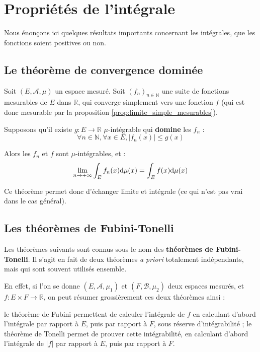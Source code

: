 \documentclass[../integ-proba.tex]{subfiles}
\begin{document}
\section{Propriétés de l'intégrale}

Nous énonçons ici quelques résultats importants concernant les intégrales, que les fonctions soient positives ou non.

\subsection{Le théorème de convergence dominée}

\begin{thm}
  \label{thm:convergence_dominee}
  Soit $\left(E,\mathcal{A},\mu\right)$ un espace mesuré.
  Soit $\left(f_n\right)_{n \in \mathbb{N}}$ une suite de fonctions mesurables de $E$ dans $\mathbb{R}$, qui converge simplement vers une fonction $f$ (qui est donc mesurable par la proposition \ref{prop:limite_simple_mesurables}).

  Supposons qu'il existe $g:E \longrightarrow \mathbb{R}$ $\mu$-intégrable qui \textbf{domine} les $f_n$ :
  $$
  \forall n \in \mathbb{N}, \forall x \in E, \left|f_n(x)\right| \leq g(x)
  $$

  Alors les $f_n$ et $f$ sont $\mu$-intégrables, et :
  $$
  \lim_{n \to + \infty} \int_E f_n(x) \textnormal{d}\mu(x) = \int_E f(x) \textnormal{d}\mu(x)
  $$
\end{thm}

\begin{rem}
  Ce théorème permet donc d'échanger limite et intégrale (ce qui n'est pas vrai dans le cas général).
\end{rem}

\subsection{Les théorèmes de Fubini-Tonelli}

Les théorèmes suivants sont connus sous le nom des \textbf{théorèmes de Fubini-Tonelli}.
Il s'agit en fait de deux théorèmes \textit{a priori} totalement indépendants, mais qui sont souvent utilisés ensemble.

En effet, si l'on se donne $\left(E, \mathcal{A}, \mu_1\right)$ et $\left(F, \mathcal{B}, \mu_2\right)$ deux espaces mesurés, et $f:E \times F \rightarrow \mathbb{R}$, on peut résumer grossièrement ces deux théorèmes ainsi :
\begin{itemize}
  \itemb le théorème de Fubini permettent de calculer l'intégrale de $f$ en calculant d'abord l'intégrale par rapport à $E$, puis par rapport à $F$, sous réserve d'intégrabilité ;
  \itemb le théorème de Tonelli permet de prouver cette intégrabilité, en calculant d'abord l'intégrale de $\left|f\right|$ par rapport à $E$, puis par rapport à $F$.
\end{itemize}
\end{document}
